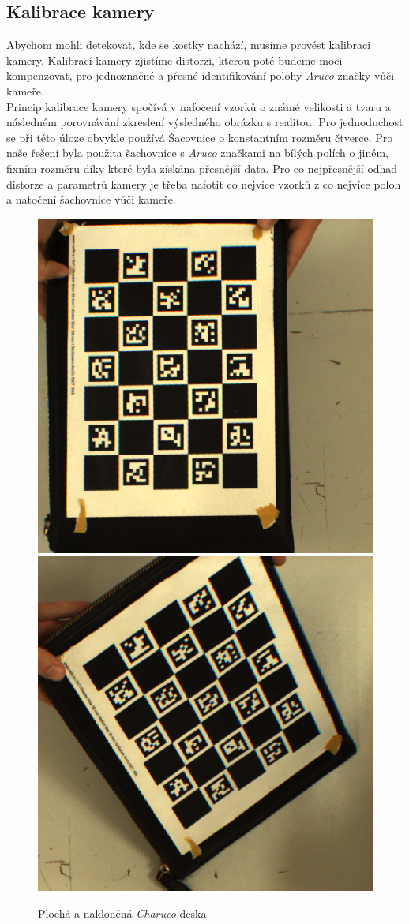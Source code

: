 \documentclass[journal,twoside,web]{ieeecolor}
\begin{document}
\subsection{Kalibrace kamery}
Abychom mohli detekovat, kde se kostky nachází, musíme provést kalibraci kamery. Kalibrací %
kamery zjistíme distorzi, kterou poté budeme moci kompenzovat, pro jednoznačné %
a přesné identifikování polohy \textit{Aruco} značky vůči kameře.\\
Princip kalibrace kamery spočívá v nafocení vzorků o známé velikosti a tvaru a následném porovnávání %
zkreslení výsledného obrázku s realitou. Pro jednoduchost se při této úloze obvykle používá
Šacovnice o konstantním rozměru čtverce. Pro naše řešení byla použita šachovnice
s \textit{Aruco} značkami na bílých polích o jiném, fixním rozměru díky které byla získána
přesnější data. Pro co nejpřesnější odhad distorze a parametrů kamery je třeba nafotit co nejvíce
vzorků z co nejvíce poloh a natočení šachovnice vůči kameře. %
\begin{figure}[h!]
    \centering
    \includegraphics[width=0.45\linewidth]{images/CharucoFlat.png}
    \includegraphics[width=0.45\linewidth]{images/CharucoSkewed.png}
    \caption{Plochá a nakloněná \textit{Charuco} deska}
    \label{fig:CharucoBoard}
\end{figure}\\
\end{document}
